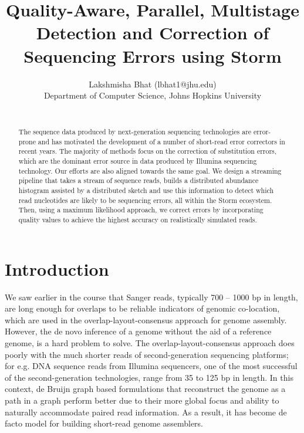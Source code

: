 \documentclass[11pt]{article}
\begin{document}
\pagestyle{plain} 
\title{Quality-Aware, Parallel, Multistage Detection and Correction of Sequencing Errors using Storm}
\large
\date{}
\author{Lakshmisha Bhat (lbhat1@jhu.edu) \\Department of Computer Science, Johns Hopkins University \\[2\baselineskip]\\ }
\maketitle
\vspace{-.5in}
\cfoot{\thepage}
\rfoot{}
\rhead{}


\begin{abstract}
The sequence data produced by next-generation sequencing technologies are error-prone and has motivated the development of a number of short-read error correctors in recent years. The majority of methods focus on the correction of substitution errors, which are the dominant error source in data produced by Illumina sequencing technology. Our efforts are also aligned towards the same goal. We design a streaming pipeline that takes a stream of sequence reads, builds a distributed abundance histogram assisted by a distributed sketch and use this information to detect which read nucleotides are likely to be sequencing errors, all within the Storm ecosystem. Then, using a maximum likelihood approach, we correct errors by incorporating quality values to achieve the highest accuracy on realistically simulated reads.\\
\end{abstract}

\section{Introduction}
We saw earlier in the course that Sanger reads, typically 700 -- 1000 bp in length, are long enough for overlaps to be reliable indicators of genomic co-location, which are used in the overlap-layout-consensus approach for genome assembly. However, the de novo inference of a genome without the aid of a reference genome, is a hard problem to solve. The overlap-layout-consensus approach does poorly with the much shorter reads of second-generation sequencing platforms; for e.g. DNA sequence reads from Illumina sequencers, one of the most successful of the second-generation technologies, range from 35 to 125 bp in length. In this context, de Bruijn graph \cite{debruijn} based formulations that reconstruct the genome as a path in a graph perform better due to their more global focus and ability to naturally accommodate paired read information. As a result, it has become de facto model for building short-read genome assemblers. \\
\end{document}
